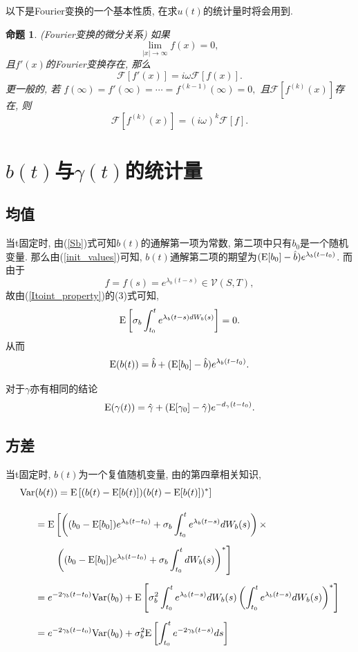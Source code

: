 \documentclass[notitlepage,cs4size,punct,oneside]{ctexrep}
\numberwithin{equation}{section}
\theoremstyle{mystyle}
\newtheorem{proposition}[definition]{\hspace{2em}命题}
\begin{document}
以下是Fourier变换的一个基本性质, 在求$u(t)$的统计量时将会用到\cite{boggess2015first}.
\begin{proposition}(Fourier变换的微分关系) \label{Fourier transform property 1}
如果
$$\lim_{|x|\to\infty} f(x) = 0,$$
且$f'(x)$的Fourier变换存在, 那么
$$\mathcal{F}[f'(x)] = i\omega\mathcal{F}[f(x)].$$
更一般的, 若
$f(\infty) = f'(\infty) = \cdots = f^{(k-1)}(\infty) = 0,$ 且$\mathcal{F}[f^{(k)}(x)]$存在, 则
$$\mathcal{F}[f^{(k)}(x)] = (i\omega)^k \mathcal{F}[f].$$
\end{proposition}

\section{$b(t)$与$\gamma(t)$的统计量}
\subsection{均值}
当t固定时, 由(\ref{Sb})式可知$b(t)$的通解第一项为常数, 第二项中只有$b_0$是一个随机变量. 那么由(\ref{init_values})可知, $b(t)$通解第二项的期望为$(\text{E}[b_0]-\hat{b})e^{\lambda_b(t-t_0)}$. 而由于
$$f = f(s) = e^{\lambda_b(t-s)}\in\mathcal{V}(S, T),$$
故由(\ref{Itoint_property})的(3)式可知,
$$\text{E}\left[\sigma_b\int_{t_0}^{t} e^{\lambda_b(t-s)dW_b(s)}\right] = 0.$$
从而
\begin{equation} \label{b_stat_1}
\text{E}(b(t)) = \hat{b} + (\text{E}[b_0] - \hat{b})e^{\lambda_b(t-t_0)}.
\end{equation}

对于$\gamma$亦有相同的结论
\begin{equation} \label{gamma_stat_1}
\text{E}(\gamma(t)) = \hat{\gamma} + (\text{E}[\gamma_0] - \hat{\gamma})e^{-d_{\gamma}(t-t_0)}.
\end{equation}

\subsection{方差}
当t固定时, $b(t)$为一个复值随机变量, 由\cite{shuyuanhe2006probability}的第四章相关知识,
\begin{equation} \label{b_stat_2_process}
\begin{split}
\text{Var}&(b(t)) = \text{E}\left[(b(t)-\text{E}[b(t)])(b(t)-\text{E}[b(t)])^*\right] \\[10pt]
&= \text{E}\left[\left((b_0-\text{E}[b_0])e^{\lambda_b(t-t_0)}+\sigma_b\int_{t_0}^t e^{\lambda_b(t-s)}dW_b(s)\right)\times\right. \\[5pt]
&\quad\quad\left.\left((b_0-\text{E}[b_0])e^{\lambda_b(t-t_0)}+\sigma_b\int_{t_0}^t dW_b(s) \right)^*\right] \\[5pt] 
&= e^{-2\gamma_b(t-t_0)}\text{Var}(b_0) + \text{E}\left[\sigma_b^2\int_{t_0}^t e^{\lambda_b(t-s)}dW_b(s)\left(\int_{t_0}^t e^{\lambda_b(t-s)}dW_b(s)\right)^*\right] \\[5pt]
&= e^{-2\gamma_b(t-t_0)}\text{Var}(b_0) + \sigma_b^2\text{E}\left[\int_{t_0}^t e^{-2\gamma_b(t-s)}ds\right]
\end{split}
\end{equation}
\end{document}
